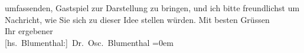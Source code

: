 \begin{ledgroupsized}[t]{13cm}
                    umfassenden, Gastspiel zur Darstellung zu bringen, und ich bitte freundlichst um
                    Nachricht, wie Sie sich zu dieser Idee stellen würden.\pend
           \pstart
           Mit besten Grüssen{\\[\baselineskip]} Ihr ergebener{\\[\baselineskip]}\spacefill\mbox{{[}hs. Blumenthal:{]} Dr. Osc. Blumenthal}\pend
           \leftskip=0em{}\endnumbering{}\end{ledgroupsized}  \newcommand{\dateiname}{L00622}\newcommand{\titel}{Oscar Blumenthal an Arthur Schnitzler, 14. 11. 1896}\newcommand{\editorInnen}{Martin Anton Müller und Gerd-Hermann Susen}
      
